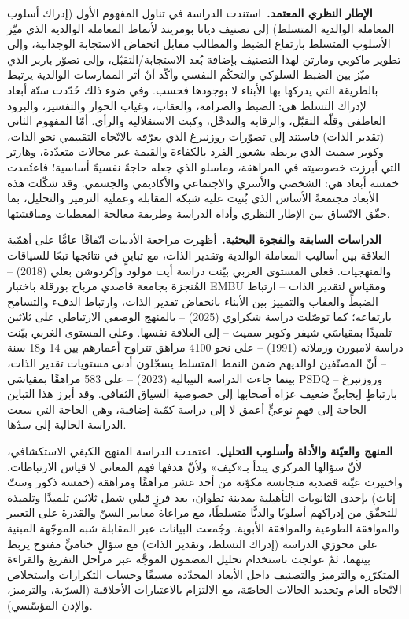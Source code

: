 \documentclass[12pt,oneside]{report}
\newcommand{\en}[1]{\textenglish{#1}}
\begin{document}
\medskip
\noindent\textbf{الإطار النظري المعتمد.}\ استندت الدراسة في تناول المفهوم الأول (إدراك أسلوب
المعاملة الوالدية المتسلط) إلى تصنيف ديانا بومريند لأنماط المعاملة الوالدية الذي ميّز الأسلوب
المتسلط بارتفاع الضبط والمطالب مقابل انخفاض الاستجابة الوجدانية، وإلى تطوير ماكوبي ومارتن لهذا
التصنيف بإضافة بُعد الاستجابة/التقبّل، وإلى تصوّر باربر الذي ميّز بين الضبط السلوكي والتحكّم
النفسي وأكّد أنّ أثر الممارسات الوالدية يرتبط بالطريقة التي يدركها بها الأبناء لا بوجودها فحسب.
وفي ضوء ذلك حُدّدت ستّة أبعاد لإدراك التسلط هي: الضبط والصرامة، والعقاب، وغياب الحوار والتفسير،
والبرود العاطفي وقلّة التقبّل، والرقابة والتدخّل، وكبت الاستقلالية والرأي. أمّا المفهوم الثاني
(تقدير الذات) فاستند إلى تصوّرات روزنبرغ الذي يعرّفه بالاتّجاه التقييمي نحو الذات، وكوبر سميث الذي
يربطه بشعور الفرد بالكفاءة والقيمة عبر مجالات متعدّدة، وهارتر التي أبرزت خصوصيته في المراهقة،
وماسلو الذي جعله حاجةً نفسيةً أساسية؛ فاعتُمدت خمسة أبعاد هي: الشخصي والأسري والاجتماعي والأكاديمي
والجسمي. وقد شكّلت هذه الأبعاد مجتمعةً الأساس الذي بُنيت عليه شبكة المقابلة وعملية الترميز
والتحليل، بما حقّق الاتّساق بين الإطار النظري وأداة الدراسة وطريقة معالجة المعطيات ومناقشتها.

\medskip
\noindent\textbf{الدراسات السابقة والفجوة البحثية.}\ أظهرت مراجعة الأدبيات اتّفاقًا عامًّا على
أهمّية العلاقة بين أساليب المعاملة الوالدية وتقدير الذات، مع تباينٍ في نتائجها تبعًا للسياقات
والمنهجيات. فعلى المستوى العربي بيّنت دراسة أيت مولود وإكردوشن بعلي (2018) -- المُنجزة بجامعة
قاصدي مرباح بورقلة باختبار \en{EMBU} ومقياسٍ لتقدير الذات -- ارتباط الضبط والعقاب والتمييز بين
الأبناء بانخفاض تقدير الذات، وارتباط الدفء والتسامح بارتفاعه؛ كما توصّلت دراسة شكراوي (2025) --
بالمنهج الوصفي الارتباطي على ثلاثين تلميذًا بمقياسَي شيفر وكوبر سميث -- إلى العلاقة نفسها. وعلى
المستوى الغربي بيّنت دراسة لامبورن وزملائه (1991) -- على نحو 4100 مراهق تتراوح أعمارهم بين 14
و18 سنة -- أنّ المصنّفين لوالديهم ضمن النمط المتسلط يسجّلون أدنى مستويات تقدير الذات، بينما جاءت
الدراسة النيبالية (2023) -- على 583 مراهقًا بمقياسَي \en{PSDQ} وروزنبرغ -- بارتباطٍ إيجابيٍّ ضعيف
عزاه أصحابها إلى خصوصية السياق الثقافي. وقد أبرز هذا التباين الحاجة إلى فهمٍ نوعيٍّ أعمق لا إلى
دراسة كمّية إضافية، وهي الحاجة التي سعت الدراسة الحالية إلى سدّها.

\medskip
\noindent\textbf{المنهج والعيّنة والأداة وأسلوب التحليل.}\ اعتمدت الدراسة المنهج الكيفي
الاستكشافي، لأنّ سؤالها المركزي يبدأ بـ«كيف» ولأنّ هدفها فهم المعاني لا قياس الارتباطات. واختيرت
عيّنة قصدية متجانسة مكوّنة من أحد عشر مراهقًا ومراهقة (خمسة ذكور وستّ إناث) بإحدى الثانويات
التأهيلية بمدينة تطوان، بعد فرزٍ قبلي شمل ثلاثين تلميذًا وتلميذة للتحقّق من إدراكهم أسلوبًا
والديًّا متسلطًا، مع مراعاة معايير السنّ والقدرة على التعبير والموافقة الطوعية والموافقة الأبوية.
وجُمعت البيانات عبر المقابلة شبه الموجّهة المبنية على محورَي الدراسة (إدراك التسلط، وتقدير الذات)
مع سؤالٍ ختاميٍّ مفتوح يربط بينهما، ثمّ عولجت باستخدام تحليل المضمون الموجَّه عبر مراحل التفريغ
والقراءة المتكرّرة والترميز والتصنيف داخل الأبعاد المحدّدة مسبقًا وحساب التكرارات واستخلاص
الاتّجاه العام وتحديد الحالات الخاصّة، مع الالتزام بالاعتبارات الأخلاقية (السرّية، والترميز،
والإذن المؤسّسي).
\end{document}
